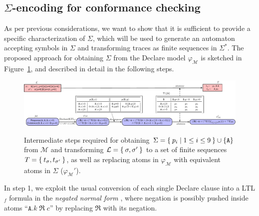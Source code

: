 

\subsection{$\Sigma$-encoding for conformance checking}\label{sec:dadtap}
As per previous considerations, we want to show that it is sufficient to provide a specific characterization of $\Sigma$, which will be used to generate an automaton accepting symbols in $\Sigma$ and transforming traces as finite sequences in $\Sigma^*$. The proposed approach for obtaining $\Sigma$ from the Declare model $\varphi_{\mathcal{M}}$ is sketched in Figure~\ref{fig:twoexamples}, and described in detail in the following steps.

\begin{figure}[!t]
	{\hspace{-1.3cm}\includegraphics[width=1.3\textwidth]{images/example_3}}
	\caption{Intermediate steps required for obtaining $\Sigma=\Set{p_i|1\leq i\leq 9}\cup\{\texttt{A}\}$ from $\mathcal{M}$ and transforming $\mathcal{L}=\Set{\sigma,\sigma'}$ to a set of finite sequences $T=\Set{t_\sigma,t_{\sigma'}}$, as well as replacing atoms in $\varphi_{\mathcal{M}}$ with equivalent atoms in $\Sigma$ ($\varphi_{\mathcal{M}}'$).}\label{fig:twoexamples}
\end{figure}
In step 1, we exploit the usual conversion of each single Declare clause into a LTL$_f$ formula in the \textit{negated normal form} \cite{LiPZVR20}, where negation is possibly pushed inside atoms ``$\texttt{A}.k\;\Re\; c$'' by replacing $\Re$ with its negation.

